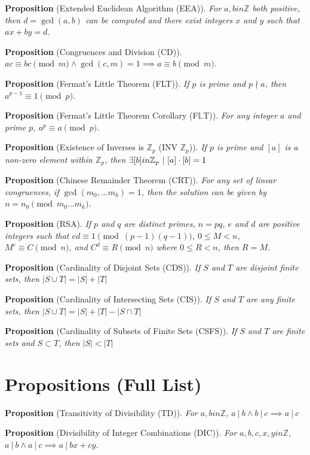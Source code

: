 \documentclass[12pt]{article}
\newcommand{\divides}{\ \!|\ \!}
\newcommand{\propositionlist}[2]{{\bf Proposition} (#1). \emph{#2}}
\begin{document}
\propositionlist{Extended Euclidean Algorithm (EEA)}{For $a,b in \mathbb{Z}$ both positive, then $d = \gcd(a,b)$ can be computed and there exist integers $x$ and $y$ such that $ax + by = d$.}

\propositionlist{Congruences and Division (CD)}{$ac \equiv bc \pmod m \land \gcd(c,m) = 1 \implies a \equiv b \pmod m$.}

\propositionlist{Fermat's Little Theorem (FLT)}{If $p$ is prime and $p \nmid a$, then $a^{p-1} \equiv 1 \pmod p$.}

\propositionlist{Fermat's Little Theorem Corollary (F$\mathbb{L}$T)}{For any integer $a$ and prime $p$, $a^p \equiv a \pmod p$.}

\propositionlist{Existence of Inverses is $\mathbb{Z}_p$ (INV $\mathbb{Z}_p$)}{If $p$ is prime and $[a]$ is a non-zero element within $\mathbb{Z}_p$, then $\exists [b] in \mathbb{Z}_p \ |\  [a] \cdot [b] = 1$}

\propositionlist{Chinese Remainder Theorem (CRT)}{For any set of linear congruences, if $\gcd(m_0,...m_k) = 1$, then the solution can be given by $n = n_0 \pmod {m_0...m_k}$.}

\propositionlist{RSA}{If $p$ and $q$ are distinct primes, $n = pq$, $e$ and $d$ are positive integers such that $ed \equiv 1 \pmod {(p-1)(q-1)}$, $0 \leq M < n$, $M^e \equiv C \pmod n$, and $C^d \equiv R \pmod n$ where $0 \leq R < n$, then $R = M$.}

\propositionlist{Cardinality of Disjoint Sets (CDS)}{If $S$ and $T$ are disjoint finite sets, then $|S \cup T| = |S| + |T|$}

\propositionlist{Cardinality of Intersecting Sets (CIS)}{If $S$ and $T$ are any finite sets, then $|S \cup T| = |S| + |T| - |S \cap T|$}

\propositionlist{Cardinality of Subsets of Finite Sets (CSFS)}{If $S$ and $T$ are finite sets and $S \subset T$, then $|S| < |T|$}

\newpage

\section*{Propositions (Full List)}

\propositionlist{Transitivity of Divisibility (TD)}{For $a, b in \mathbb{Z}$, $a\divides b \land b\divides c \implies a\divides c$}

\propositionlist{Divisibility of Integer Combinations (DIC)}{For $a,b,c,x,y in \mathbb{Z}$, $a\divides b \land a\divides c \implies a\divides bx + cy$.}
\end{document}
